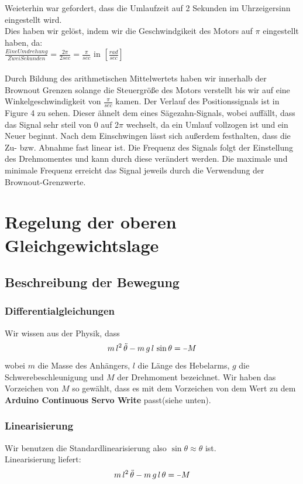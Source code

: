 \documentclass{article}
\newcommand{\minus}{\scalebox{0.75}[1.0]{$-$}}
\newcommand{\gera}{\"{a}}
\begin{document}
\vspace{5mm}
Weieterhin war gefordert, dass die Umlaufzeit auf 2 Sekunden im Uhrzeigersinn eingestellt wird.\\Dies haben wir gelöst, indem wir die Geschwindgikeit des Motors auf $\pi$ eingestellt haben, da:\\
$\frac{Eine Umdrehung}{Zwei Sekunden} = \frac{2\pi}{2sec} = \frac{\pi}{sec}$ in $[\frac{rad}{sec}]$\\
\\Durch Bildung des arithmetischen Mittelwertets haben wir innerhalb der Brownout Grenzen solange die Steuergröße des Motors verstellt bis wir auf eine Winkelgeschwindigkeit von $\frac{\pi}{sec}$ kamen.
Der Verlauf des Positionssignals ist in Figure 4 zu sehen. Dieser ähnelt dem eines Sägezahn-Signals, wobei auffällt, dass das Signal sehr steil von 0 auf $2\pi$ wechselt, da ein Umlauf vollzogen ist und ein Neuer beginnt.
Nach dem Einschwingen lässt sich außerdem festhalten, dass die Zu- bzw. Abnahme fast linear ist.
Die Frequenz des Signals folgt der Einstellung des Drehmomentes und kann durch diese verändert werden. Die maximale und minimale Frequenz erreicht das Signal jeweils durch die Verwendung der Brownout-Grenzwerte.


\newpage


\section{Regelung der oberen Gleichgewichtslage}
\subsection{Beschreibung der Bewegung}
\subsubsection{Differentialgleichungen}
Wir wissen aus der Physik, dass
\begin{equation}\label{eq:physics}
  m \,l^2 \, \ddot{\theta} - m\,g\,l\,\sin{\theta} = \minus M
\end{equation}
wobei $m$ die Masse des Anh\gera ngers, $l$ die L\gera nge des Hebelarms, $g$ die Schwerebeschleunigung und $M$ der Drehmoment bezeichnet. Wir haben das Vorzeichen von $M$ so gew\gera hlt, dass es mit dem Vorzeichen von dem Wert zu dem \textbf{Arduino Continuous Servo Write} passt(siehe unten).\\
\subsubsection{Linearisierung}
Wir benutzen die Standardlinearisierung also $\sin{\theta} \approx \theta$ ist. \\
Linearisierung liefert: 
\begin{equation}\label{eq:linear}
  m \,l^2 \, \ddot{\theta} - m\,g\,l\, \theta = \minus M
\end{equation}
\end{document}
